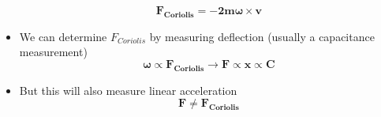 \documentclass[10pt]{beamer}
\begin{document}
\begin{frame}
\begin{columns}
\begin{column}{.60\textwidth}
\begin{itemize}
\begin{equation*}
                \mathbf{F_{Coriolis} = - 2 m \mathbf{\omega} \times \mathbf{v}}
            \end{equation*}
            \item We can determine $F_{Coriolis}$ by measuring deflection (usually a capacitance measurement)
            \begin{equation*}
                \mathbf{\omega} \propto \mathbf{F_{Coriolis}} \to \mathbf{F} \propto \mathbf{x} \propto \mathbf{C}
            \end{equation*}
            \item But this will also measure linear acceleration
            \begin{equation*}
                \mathbf{F \neq F_{Coriolis}}
            \end{equation*}
        \end{itemize}
    \end{column}
\end{columns}
\end{frame}
\end{document}
